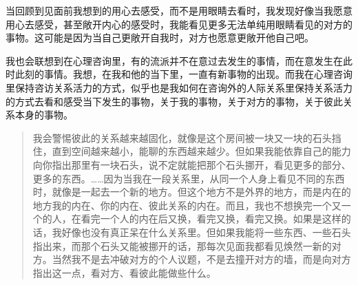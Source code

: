 当回顾到见面前我想到的用心去感受，而不是用眼睛去看时，我发现好像当我愿意用心去感受，甚至敞开内心的感受时，我能看见更多无法单纯用眼睛看见的对方的事物。这可能是因为当自己更敞开自我时，对方也愿意更敞开他自己吧。

我也会联想到在心理咨询里，有的流派并不在意过去发生的事情，而在意发生在此时此刻的事情。我想，在我和他的当下里，一直有新事物的出现。而我在心理咨询里保持咨访关系活力的方式，似乎也是我如何在咨询外的人际关系里保持关系活力的方式\pozhehao{}去看和感受当下发生的事物，关于我的事物，关于对方的事物，关于彼此关系本身的事物。

\blockquote{
    我会警惕彼此的关系越来越固化，就像是这个房间被一块又一块的石头挡住，直到空间越来越小，能聊的东西越来越少。但如果我能依靠自己的能力向你指出那里有一块石头，说不定就能把那个石头挪开，看见更多的部分、更多的东西。……因为当我在一段关系里，从同一个人身上看见不同的东西时，就像是一起去一个新的地方。但这个地方不是外界的地方，而是内在的地方\pozhehao{}我的内在、你的内在、彼此关系的内在。而且，我也不想换完一个又一个的人，在看完一个人的内在后又换，看完又换，看完又换。如果是这样的话，我好像也没有真正呆在什么关系里。但如果我能将一些东西、一些石头指出来，而那个石头又能被挪开的话，那每次见面我都看见焕然一新的对方。当然我不是去冲破对方的个人议题，不是去撞开对方的墙，而是向对方指出这一点，看对方、看彼此能做些什么。

}

